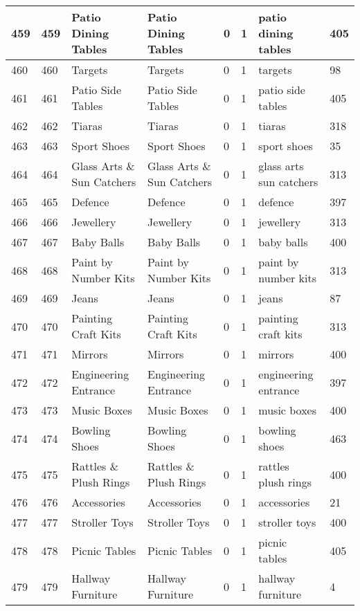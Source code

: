 \begin{longtable}{|l|l|l|l|l|l|l|l|}
459 & 459 & Patio Dining Tables & Patio Dining Tables & 0 & 1 & patio dining tables & 405 \\ \hline 
460 & 460 & Targets & Targets & 0 & 1 & targets & 98 \\ \hline 
461 & 461 & Patio Side Tables & Patio Side Tables & 0 & 1 & patio side tables & 405 \\ \hline 
462 & 462 & Tiaras & Tiaras & 0 & 1 & tiaras & 318 \\ \hline 
463 & 463 & Sport Shoes & Sport Shoes & 0 & 1 & sport shoes & 35 \\ \hline 
464 & 464 & Glass Arts \& Sun Catchers & Glass Arts \& Sun Catchers & 0 & 1 & glass arts sun catchers & 313 \\ \hline 
465 & 465 & Defence & Defence & 0 & 1 & defence & 397 \\ \hline 
466 & 466 & Jewellery & Jewellery & 0 & 1 & jewellery & 313 \\ \hline 
467 & 467 & Baby Balls & Baby Balls & 0 & 1 & baby balls & 400 \\ \hline 
468 & 468 & Paint by Number Kits & Paint by Number Kits & 0 & 1 & paint by number kits & 313 \\ \hline 
469 & 469 & Jeans & Jeans & 0 & 1 & jeans & 87 \\ \hline 
470 & 470 & Painting Craft Kits & Painting Craft Kits & 0 & 1 & painting craft kits & 313 \\ \hline 
471 & 471 & Mirrors & Mirrors & 0 & 1 & mirrors & 400 \\ \hline 
472 & 472 & Engineering Entrance & Engineering Entrance & 0 & 1 & engineering entrance & 397 \\ \hline 
473 & 473 & Music Boxes & Music Boxes & 0 & 1 & music boxes & 400 \\ \hline 
474 & 474 & Bowling Shoes & Bowling Shoes & 0 & 1 & bowling shoes & 463 \\ \hline 
475 & 475 & Rattles \& Plush Rings & Rattles \& Plush Rings & 0 & 1 & rattles plush rings & 400 \\ \hline 
476 & 476 & Accessories & Accessories & 0 & 1 & accessories & 21 \\ \hline 
477 & 477 & Stroller Toys & Stroller Toys & 0 & 1 & stroller toys & 400 \\ \hline 
478 & 478 & Picnic Tables & Picnic Tables & 0 & 1 & picnic tables & 405 \\ \hline 
479 & 479 & Hallway Furniture & Hallway Furniture & 0 & 1 & hallway furniture & 4 \\ \hline 

\end{longtable}
